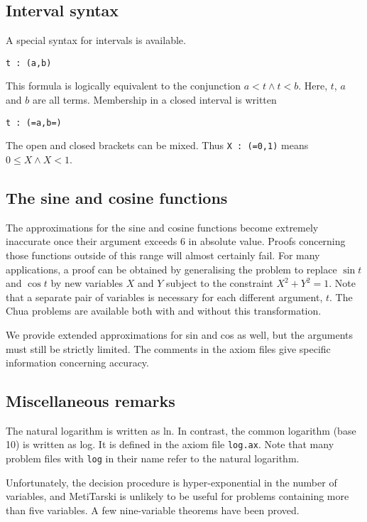 \documentclass[a4paper,11pt]{scrartcl}
\begin{document}
\subsection{Interval syntax}

A special syntax for intervals is available.
\begin{verbatim}
t : (a,b)
\end{verbatim}

This formula is logically equivalent to the conjunction $a<t \wedge t<b$. Here, $t$, $a$ and $b$
are all terms. Membership in a closed interval is written

\begin{verbatim}
t : (=a,b=)
\end{verbatim}
%
The open and closed brackets can be mixed.
Thus \texttt{X :\ (=0,1)}
means $0 \leq X \wedge X < 1$.

\subsection{The sine and cosine functions}

The approximations for the sine and cosine functions become extremely inaccurate
once their argument exceeds 6 in absolute value. Proofs concerning those
functions outside of this range will almost certainly fail. For many
applications, a proof can be obtained by generalising the problem to replace
$\sin t$ and $\cos t$ by new variables $X$ and $Y$ subject to the constraint $X^2+Y^2=1$.
Note that a separate pair of variables is necessary for each
different argument, $t$. The Chua problems are available both with and without this transformation.

We provide extended approximations for sin and cos as well,
but the arguments must still be strictly limited. The comments in
the axiom files give specific information concerning accuracy.

\subsection{Miscellaneous remarks}

The natural logarithm is written as ln. In contrast, the common logarithm (base
10) is written as log.  It is defined in the axiom file \texttt{log.ax}.
Note that many problem files with \texttt{log} in their name refer to the natural logarithm.

Unfortunately, the decision procedure is hyper-exponential in the number of
variables, and MetiTarski is unlikely to be useful for problems containing more
than five variables.  A few nine-variable theorems have been proved.
\end{document}

